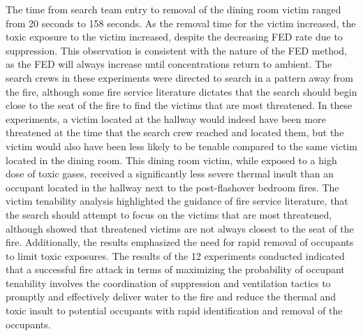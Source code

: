 \documentclass[12pt,oneside]{article}
\begin{document}
The time from search team entry to removal of the dining room victim ranged from 20 seconds to 158 seconds.  As the removal time for the victim increased, the toxic exposure to the victim increased, despite the decreasing FED rate due to suppression. This observation is consistent with the nature of the FED method, as the FED will always increase until concentrations return to ambient. The search crews in these experiments were directed to search in a pattern away from the fire, although some fire service literature dictates that the search should begin close to the seat of the fire to find the victims that are most threatened. In these experiments, a victim located at the hallway would indeed have been more threatened at the time that the search crew reached and located them, but the victim would also have been less likely to be tenable compared to the same victim located in the dining room. This dining room victim, while exposed to a high dose of toxic gases, received a significantly less severe thermal insult than an occupant located in the hallway next to the post-flashover bedroom fires. The victim tenability analysis highlighted the guidance of fire service literature, that the search should attempt to focus on the victims that are most threatened, although showed that threatened victims are not always closest to the seat of the fire. Additionally, the results emphasized the need for rapid removal of occupants to limit toxic exposures. The results of the 12 experiments conducted indicated that a successful fire attack in terms of maximizing the probability of occupant tenability involves the coordination of suppression  and ventilation tactics to promptly and effectively deliver water to the fire and reduce the thermal and toxic insult to potential occupants with rapid identification and removal of the occupants. 



\end{document}
